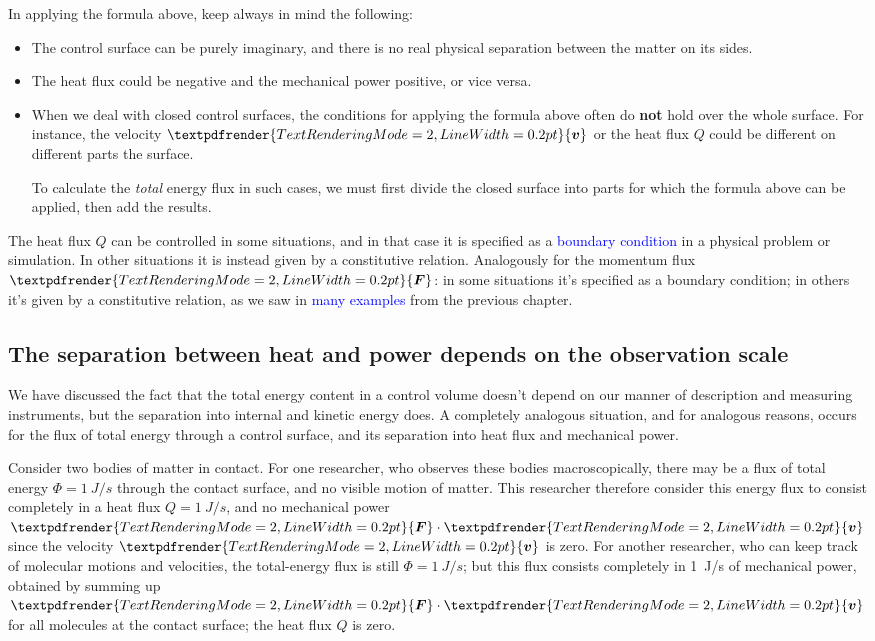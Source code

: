 \documentclass[a4paper,12pt,%
onecolumn,oneside,%
british%
]{memoir}
\renewcommand*{\bm}[1]{\textpdfrender{TextRenderingMode=2,LineWidth=0.2pt}{\boldsymbol{#1}}}
\renewcommand*{\|}[1][]{\nonscript\:#1\vert\nonscript\:\mathopen{}}
\newcommand*{\sect}{\S}%
\renewcommand*{\autoref}[2]{\sidepar{\vspace{-1ex}\footnotesize{\color{blue}\faIcon{%
angle-right%
}\enskip\sect~\ref{#1} page~\pageref{#1}}}\textcolor{blue}{#2}}
\newcommand*{\yv}{\bm{v}}
\newcommand*{\yH}{\varPhi}%
\newcommand*{\yQ}{Q}%
\newcommand*{\yF}{\bm{F}}
\begin{document}
\begin{warning}[Tricky points in applying the energy-flux formula,label={warn:energyflux}]
In applying the formula above, keep always in mind the following:
\begin{itemize}
\item The control surface can be purely imaginary, and there is no real physical separation between the matter on its sides.

\item The heat flux could be negative and the mechanical power positive, or vice versa.

\item When we deal with closed control surfaces, the conditions for applying the formula above often do \textbf{not} hold over the whole surface. For instance, the velocity $\yv$ or the heat flux $\yQ$ could be different on different parts the surface.

  To calculate the \emph{total} energy flux in such cases, we  must first divide the closed surface into parts for which the formula above can be applied, then add the results.
\end{itemize}
\end{warning}

The heat flux $\yQ$ can be controlled in some situations, and in that case it is specified as a \autoref{sec:boundary_conds}{boundary condition} in a physical problem or simulation. In other situations it is instead given by a constitutive relation. Analogously for the momentum flux $\yF$: in some situations it's specified as a boundary condition; in others it's given by a constitutive relation, as we saw in \autoref{sec:momentum_constitutive}{many examples} from the previous chapter.


\subsection{The separation between heat and power depends on the observation scale}
\label{sec:dependence_energyfluxdivision}

We have discussed the fact that the total energy content in a control volume doesn't depend on our manner of description and measuring instruments, but the separation into internal and kinetic energy does. A completely analogous situation, and for analogous reasons, occurs for the flux of total energy through a control surface, and its separation into heat flux and mechanical power.

Consider two bodies of matter in contact. For one researcher, who observes these bodies macroscopically, there may be a flux of total energy $\yH=\qty{1}{J/s}$ through the contact surface, and no visible motion of matter. This researcher therefore consider this energy flux to consist completely in a heat flux $\yQ=\qty{1}{J/s}$, and no mechanical power $\yF\cdot\yv$ since the velocity $\yv$ is zero. For another researcher, who can keep track of molecular motions and velocities, the total-energy flux is still $\yH=\qty{1}{J/s}$; but this flux consists completely in \qty{1}{J/s} of mechanical power, obtained by summing up $\yF\cdot\yv$ for all molecules at the contact surface; the heat flux $\yQ$ is zero.
\end{document}
